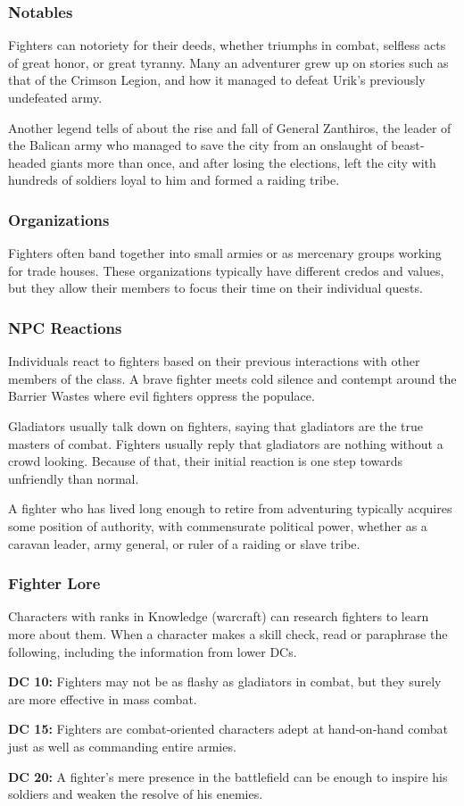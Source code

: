 \subsubsection{Notables}

Fighters can notoriety for their deeds, whether triumphs in combat, selfless acts of great honor, or great tyranny. Many an adventurer grew up on stories such as that of the Crimson Legion, and how it managed to defeat Urik’s previously undefeated army.

Another legend tells of about the rise and fall of General Zanthiros, the leader of the Balican army who managed to save the city from an onslaught of beast‐headed giants more than once, and after losing the elections, left the city with hundreds of soldiers loyal to him and formed a raiding tribe.

\subsubsection{Organizations}

Fighters often band together into small armies or as mercenary groups working for trade houses. These organizations typically have different credos and values, but they allow their members to focus their time on their individual quests.

\subsubsection{NPC Reactions}

Individuals react to fighters based on their previous interactions with other members of the class. A brave fighter meets cold silence and contempt around the Barrier Wastes where evil fighters oppress the populace.

Gladiators usually talk down on fighters, saying that gladiators are the true masters of combat. Fighters usually reply that gladiators are nothing without a crowd looking. Because of that, their initial reaction is one step towards unfriendly than normal.

A fighter who has lived long enough to retire from adventuring typically acquires some position of authority, with commensurate political power, whether as a caravan leader, army general, or ruler of a raiding or slave tribe.

\subsubsection{Fighter Lore}

Characters with ranks in Knowledge (warcraft) can research fighters to learn more about them. When a character makes a skill check, read or paraphrase the following, including the information from lower DCs.

\textbf{DC 10:} Fighters may not be as flashy as gladiators in combat, but they surely are more effective in mass combat.

\textbf{DC 15:} Fighters are combat‐oriented characters adept at hand‐on‐hand combat just as well as commanding entire armies.

\textbf{DC 20:} A fighter’s mere presence in the battlefield can be enough to inspire his soldiers and weaken the resolve of his enemies.
